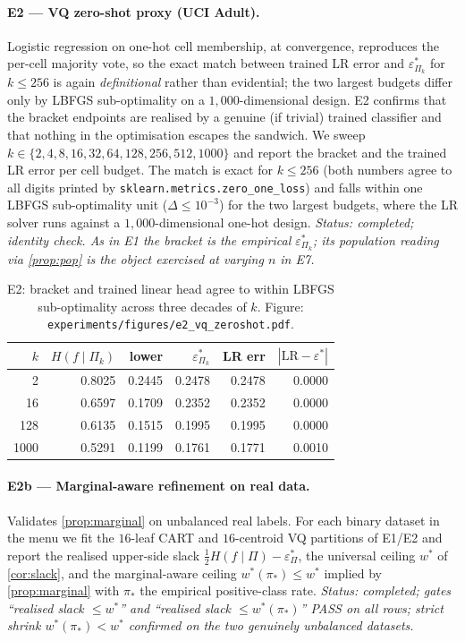 \documentclass[10pt]{article}
\theoremstyle{definition}
\theoremstyle{remark}
\newcommand{\eps}{\varepsilon}
\begin{document}
\paragraph{E2 --- VQ zero-shot proxy (UCI Adult).} Logistic
regression on one-hot cell membership, at convergence,
reproduces the per-cell majority vote, so the exact match between
trained LR error and $\eps^{*}_{\Pi_{k}}$ for $k \le 256$ is
again \emph{definitional} rather than evidential; the two
largest budgets differ only by LBFGS sub-optimality on a
$1{,}000$-dimensional design. E2 confirms that the bracket
endpoints are realised by a genuine (if trivial) trained
classifier and that nothing in the optimisation escapes the
sandwich. We sweep $k \in \{2, 4, 8, 16, 32, 64, 128, 256, 512,
1000\}$ and report the bracket and the trained LR error per cell
budget. The match is exact for $k \le 256$ (both numbers agree to
all digits printed by
\texttt{sklearn.metrics.zero\_one\_loss}) and falls within one
LBFGS sub-optimality unit ($\Delta \le 10^{-3}$) for the two
largest budgets, where the LR solver runs against a
$1{,}000$-dimensional one-hot design. \emph{Status: completed;
identity check. As in E1 the bracket is the empirical
$\eps^{*}_{\Pi_{k}}$; its population reading via
\cref{prop:pop} is the object exercised at varying $n$ in E7.}

\begin{table}[h]\centering\small
\begin{tabular}{rrrrrr}
\toprule
$k$ & $H(f\mid\Pi_k)$ & lower & $\eps^{*}_{\Pi_k}$
   & LR err & $|\mathrm{LR} - \eps^{*}|$ \\
\midrule
2    & 0.8025 & 0.2445 & 0.2478 & 0.2478 & 0.0000 \\
16   & 0.6597 & 0.1709 & 0.2352 & 0.2352 & 0.0000 \\
128  & 0.6135 & 0.1515 & 0.1995 & 0.1995 & 0.0000 \\
1000 & 0.5291 & 0.1199 & 0.1761 & 0.1771 & 0.0010 \\
\bottomrule
\end{tabular}
\caption{E2: bracket and trained linear head agree to within
LBFGS sub-optimality across three decades of $k$.
Figure: \texttt{experiments/figures/e2\_vq\_zeroshot.pdf}.}
\label{tab:e2}
\end{table}

\paragraph{E2b --- Marginal-aware refinement on real data.}
Validates \cref{prop:marginal} on unbalanced real labels. For
each binary dataset in the menu we fit the $16$-leaf CART and
$16$-centroid VQ partitions of E1/E2 and report the realised
upper-side slack $\tfrac{1}{2} H(f \mid \Pi) - \eps^{*}_{\Pi}$,
the universal ceiling $w^{*}$ of \cref{cor:slack}, and the
marginal-aware ceiling $w^{*}(\pi_{*}) \le w^{*}$ implied by
\cref{prop:marginal} with $\pi_{*}$ the empirical positive-class
rate. \emph{Status: completed; gates ``realised slack
$\le w^{*}$'' and ``realised slack $\le w^{*}(\pi_{*})$'' PASS
on all rows; strict shrink $w^{*}(\pi_{*}) < w^{*}$ confirmed
on the two genuinely unbalanced datasets.}
\end{document}
